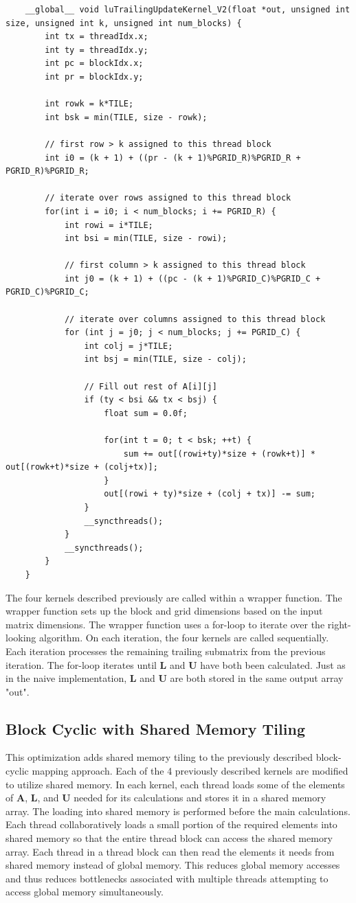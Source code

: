 \documentclass{article}
\begin{document}
\begin{verbatim}
	__global__ void luTrailingUpdateKernel_V2(float *out, unsigned int size, unsigned int k, unsigned int num_blocks) {
		int tx = threadIdx.x;
		int ty = threadIdx.y;
		int pc = blockIdx.x;
		int pr = blockIdx.y;
		
		int rowk = k*TILE;
		int bsk = min(TILE, size - rowk);
		
		// first row > k assigned to this thread block
		int i0 = (k + 1) + ((pr - (k + 1)%PGRID_R)%PGRID_R + PGRID_R)%PGRID_R;
		
		// iterate over rows assigned to this thread block
		for(int i = i0; i < num_blocks; i += PGRID_R) {
			int rowi = i*TILE;
			int bsi = min(TILE, size - rowi);
			
			// first column > k assigned to this thread block
			int j0 = (k + 1) + ((pc - (k + 1)%PGRID_C)%PGRID_C + PGRID_C)%PGRID_C;
			
			// iterate over columns assigned to this thread block
			for (int j = j0; j < num_blocks; j += PGRID_C) {
				int colj = j*TILE;
				int bsj = min(TILE, size - colj);
				
				// Fill out rest of A[i][j]
				if (ty < bsi && tx < bsj) {
					float sum = 0.0f;
					
					for(int t = 0; t < bsk; ++t) {
						sum += out[(rowi+ty)*size + (rowk+t)] * out[(rowk+t)*size + (colj+tx)];
					}
					out[(rowi + ty)*size + (colj + tx)] -= sum;
				}
				__syncthreads();
			}
			__syncthreads();
		}
	}
\end{verbatim}

The four kernels described previously are called within a wrapper function. The wrapper function sets up the block and grid dimensions based on the input matrix dimensions. The wrapper function uses a for-loop to iterate over the right-looking algorithm. On each iteration, the four kernels are called sequentially. Each iteration processes the remaining trailing submatrix from the previous iteration. The for-loop iterates until $\mathbf{L}$ and $\mathbf{U}$ have both been calculated. Just as in the naive implementation, $\mathbf{L}$ and $\mathbf{U}$ are both stored in the same output array "out".

\subsection{Block Cyclic with Shared Memory Tiling}
This optimization adds shared memory tiling to the previously described block-cyclic mapping approach. Each of the 4 previously described kernels are modified to utilize shared memory. In each kernel, each thread loads some of the elements of $\mathbf{A}$, $\mathbf{L}$, and $\mathbf{U}$ needed for its calculations and stores it in a shared memory array. The loading into shared memory is performed before the main calculations. Each thread collaboratively loads a small portion of the required elements into shared memory so that the entire thread block can access the shared memory array. Each thread in a thread block can then read the elements it needs from shared memory instead of global memory. This reduces global memory accesses and thus reduces bottlenecks associated with multiple threads attempting to access global memory simultaneously.
\end{document}

